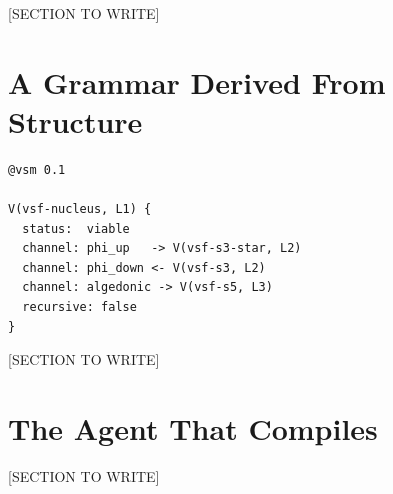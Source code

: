 \documentclass[12pt]{article}
\begin{document}

[SECTION TO WRITE]

\section{A Grammar Derived From Structure}
\label{sec:design}


\begin{lstlisting}
@vsm 0.1

V(vsf-nucleus, L1) {
  status:  viable
  channel: phi_up   -> V(vsf-s3-star, L2)
  channel: phi_down <- V(vsf-s3, L2)
  channel: algedonic -> V(vsf-s5, L3)
  recursive: false
}
\end{lstlisting}

[SECTION TO WRITE]

\section{The Agent That Compiles}
\label{sec:agent}


[SECTION TO WRITE]

\end{document}
